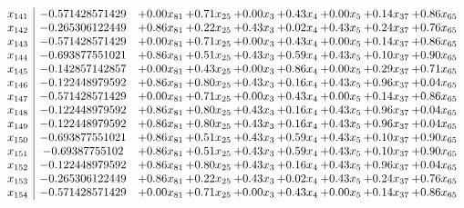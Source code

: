 \documentclass[8pt]{article}
\begin{document}
\[\begin{array}{c| c c@{\hskip 2pt} c@{\hskip 2pt} c@{\hskip 2pt} c@{\hskip 2pt} c@{\hskip 2pt} c@{\hskip 2pt} c@{\hskip 2pt} }
 x_{141}   &  -0.571428571429 & +  0.00 x_{81} & +  0.71 x_{25} & +  0.00 x_{3} & +  0.43 x_{4} & +  0.00 x_{5} & +  0.14 x_{37} & +  0.86 x_{65}\\
 x_{142}   &  -0.265306122449 & +  0.86 x_{81} & +  0.22 x_{25} & +  0.43 x_{3} & +  0.02 x_{4} & +  0.43 x_{5} & +  0.24 x_{37} & +  0.76 x_{65}\\
 x_{143}   &  -0.571428571429 & +  0.00 x_{81} & +  0.71 x_{25} & +  0.00 x_{3} & +  0.43 x_{4} & +  0.00 x_{5} & +  0.14 x_{37} & +  0.86 x_{65}\\
 x_{144}   &  -0.693877551021 & +  0.86 x_{81} & +  0.51 x_{25} & +  0.43 x_{3} & +  0.59 x_{4} & +  0.43 x_{5} & +  0.10 x_{37} & +  0.90 x_{65}\\
 x_{145}   &  -0.142857142857 & +  0.00 x_{81} & +  0.43 x_{25} & +  0.00 x_{3} & +  0.86 x_{4} & +  0.00 x_{5} & +  0.29 x_{37} & +  0.71 x_{65}\\
 x_{146}   &  -0.122448979592 & +  0.86 x_{81} & +  0.80 x_{25} & +  0.43 x_{3} & +  0.16 x_{4} & +  0.43 x_{5} & +  0.96 x_{37} & +  0.04 x_{65}\\
 x_{147}   &  -0.571428571429 & +  0.00 x_{81} & +  0.71 x_{25} & +  0.00 x_{3} & +  0.43 x_{4} & +  0.00 x_{5} & +  0.14 x_{37} & +  0.86 x_{65}\\
 x_{148}   &  -0.122448979592 & +  0.86 x_{81} & +  0.80 x_{25} & +  0.43 x_{3} & +  0.16 x_{4} & +  0.43 x_{5} & +  0.96 x_{37} & +  0.04 x_{65}\\
 x_{149}   &  -0.122448979592 & +  0.86 x_{81} & +  0.80 x_{25} & +  0.43 x_{3} & +  0.16 x_{4} & +  0.43 x_{5} & +  0.96 x_{37} & +  0.04 x_{65}\\
 x_{150}   &  -0.693877551021 & +  0.86 x_{81} & +  0.51 x_{25} & +  0.43 x_{3} & +  0.59 x_{4} & +  0.43 x_{5} & +  0.10 x_{37} & +  0.90 x_{65}\\
 x_{151}   &  -0.69387755102 & +  0.86 x_{81} & +  0.51 x_{25} & +  0.43 x_{3} & +  0.59 x_{4} & +  0.43 x_{5} & +  0.10 x_{37} & +  0.90 x_{65}\\
 x_{152}   &  -0.122448979592 & +  0.86 x_{81} & +  0.80 x_{25} & +  0.43 x_{3} & +  0.16 x_{4} & +  0.43 x_{5} & +  0.96 x_{37} & +  0.04 x_{65}\\
 x_{153}   &  -0.265306122449 & +  0.86 x_{81} & +  0.22 x_{25} & +  0.43 x_{3} & +  0.02 x_{4} & +  0.43 x_{5} & +  0.24 x_{37} & +  0.76 x_{65}\\
 x_{154}   &  -0.571428571429 & +  0.00 x_{81} & +  0.71 x_{25} & +  0.00 x_{3} & +  0.43 x_{4} & +  0.00 x_{5} & +  0.14 x_{37} & +  0.86 x_{65}\\

\end{array}\]
\end{document}
